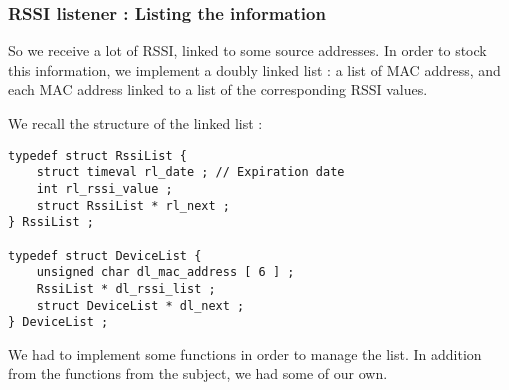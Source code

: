 \subsubsection{RSSI listener : Listing the information}

So we receive a lot of RSSI, linked to some source addresses. In order to stock
this information, we implement a doubly linked list : a list of MAC address,
and each MAC address linked to a list of the corresponding RSSI values.

We recall the structure of the linked list : 

\begin{lstlisting} 
typedef struct RssiList {
	struct timeval rl_date ; // Expiration date
	int rl_rssi_value ;
	struct RssiList * rl_next ;
} RssiList ;

typedef struct DeviceList {
	unsigned char dl_mac_address [ 6 ] ;
	RssiList * dl_rssi_list ;
	struct DeviceList * dl_next ;
} DeviceList ;
\end{lstlisting}

We had to implement some functions in order to manage the list. In addition
from the functions from the subject, we had some of our own.

